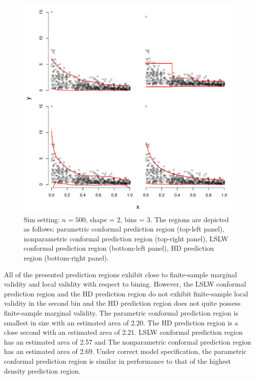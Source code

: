 \documentclass[11pt]{article}\usepackage[]{graphicx}\usepackage[]{color}
\makeatletter
\def\maxwidth{ %
  \ifdim\Gin@nat@width>\linewidth
    \linewidth
  \else
    \Gin@nat@width
  \fi
}
\newenvironment{knitrout}{}{} %
\makeatother
\begin{document}
\begin{figure}[h!]
\begin{center}
\begin{knitrout}
\color{fgcolor}
\includegraphics[width=\maxwidth]{figure/gammasimexample-1} 

\end{knitrout}
\end{center}
\caption{Sim setting: $n = 500$, shape = $2$, bins = $3$. 
  The regions are depicted as follows: 
    parametric conformal prediction region (top-left panel),
    nonparametric conformal prediction region (top-right panel),
    LSLW conformal prediction region (bottom-left panel),
    HD prediction region (bottom-right panel).}
\label{Fig:plots}
\end{figure}

All of the presented prediction regions exhibit close to finite-sample 
marginal validity and local validity with respect to bining.  However, 
the LSLW conformal prediction region and the HD prediction region do not 
exhibit finite-sample local validity in the second bin and the HD prediction 
region does not quite possess finite-sample marginal validity.  The parametric 
conformal prediction region is smallest in size with an estimated area of 
2.20.  The HD prediction region is a close second with an estimated area of 
2.21.  LSLW conformal prediction region has an estimated area of 2.57 and 
The nonparametric conformal prediction region has an estimated area of 2.69.  
Under correct model specification, the parametric conformal prediction 
region is similar in performance to that of the highest density prediction 
region.
\end{document}
